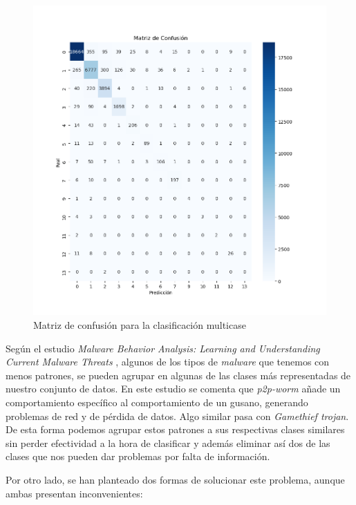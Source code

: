 \begin{figure}[H]
	\centering
	\includegraphics[width=1.2\linewidth]{Imagenes/confusion_multiclase}
	\caption[Matriz de confusión para la clasificación multicase]{Matriz de confusión para la clasificación multicase}
	\label{fig:confusion}
\end{figure}

Según el estudio \textit{Malware Behavior Analysis: Learning and Understanding Current Malware Threats} \cite{mba}, algunos de los tipos de \textit{malware} que tenemos con menos patrones, se pueden agrupar en algunas de las clases más representadas de nuestro conjunto de datos. En este estudio se comenta que \textit{p2p-worm} añade un comportamiento específico al comportamiento de un gusano, generando problemas de red y de pérdida de datos. Algo similar pasa con \textit{Gamethief trojan}. De esta forma podemos agrupar estos patrones a sus respectivas clases similares sin perder efectividad a la hora de clasificar y además eliminar así dos de las clases que nos pueden dar problemas por falta de información.

\vspace{1em}

Por otro lado, se han planteado dos formas de solucionar este problema, aunque ambas presentan inconvenientes:

